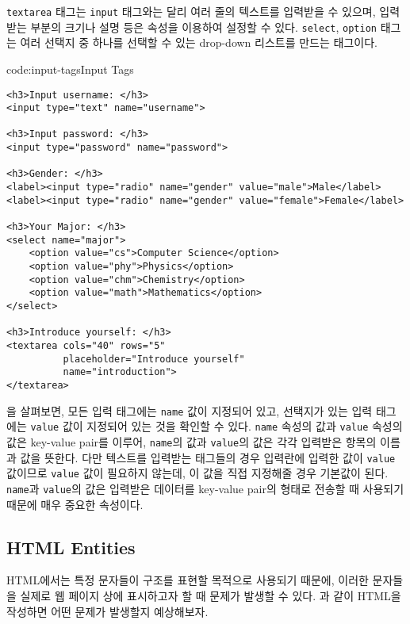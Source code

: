 \texttt{textarea} 태그는 \texttt{input} 태그와는 달리 여러 줄의 텍스트를 입력받을 수 있으며, 입력받는 부분의 크기나 설명 등은 속성을 이용하여 설정할 수 있다. \texttt{select}, \texttt{option} 태그는 여러 선택지 중 하나를 선택할 수 있는 drop-down 리스트를 만드는 태그이다. 

\begin{codeenv}{code:input-tags}{Input Tags}\begin{verbatim}
<h3>Input username: </h3>
<input type="text" name="username">

<h3>Input password: </h3>
<input type="password" name="password">

<h3>Gender: </h3>
<label><input type="radio" name="gender" value="male">Male</label>
<label><input type="radio" name="gender" value="female">Female</label>

<h3>Your Major: </h3>
<select name="major">
    <option value="cs">Computer Science</option>
    <option value="phy">Physics</option>
    <option value="chm">Chemistry</option>
    <option value="math">Mathematics</option>
</select>

<h3>Introduce yourself: </h3>
<textarea cols="40" rows="5"
          placeholder="Introduce yourself"
          name="introduction">
</textarea>
\end{verbatim}
\end{codeenv}

을 살펴보면, 모든 입력 태그에는 \texttt{name} 값이 지정되어 있고, 선택지가 있는 입력 태그에는 \texttt{value} 값이 지정되어 있는 것을 확인할 수 있다. \texttt{name} 속성의 값과 \texttt{value} 속성의 값은 key-value pair를 이루어, \texttt{name}의 값과 \texttt{value}의 값은 각각 입력받은 항목의 이름과 값을 뜻한다. 다만 텍스트를 입력받는 태그들의 경우 입력란에 입력한 값이 \texttt{value} 값이므로 \texttt{value} 값이 필요하지 않는데, 이 값을 직접 지정해줄 경우 기본값이 된다. \texttt{name}과 \texttt{value}의 값은 입력받은 데이터를 key-value pair의 형태로 전송할 때 사용되기 때문에 매우 중요한 속성이다.

\subsection*{HTML Entities}

HTML에서는 특정 문자들이 구조를 표현할 목적으로 사용되기 때문에, 이러한 문자들을 실제로 웹 페이지 상에 표시하고자 할 때 문제가 발생할 수 있다. 과 같이 HTML을 작성하면 어떤 문제가 발생할지 예상해보자. 

